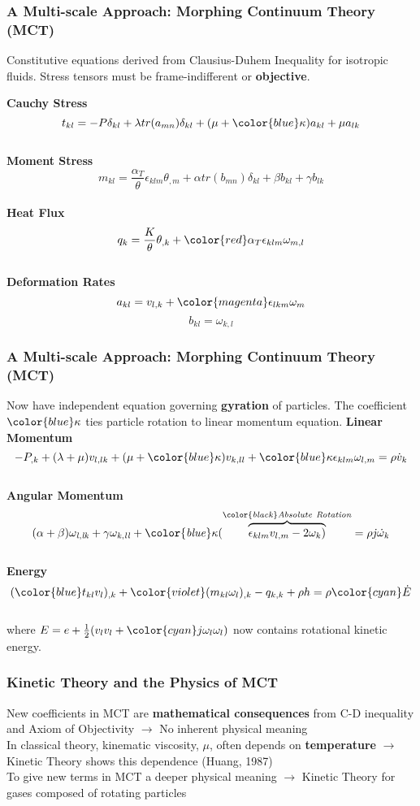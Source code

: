 \documentclass{beamer}
\begin{document}
\begin{frame}
\frametitle{A Multi-scale Approach: Morphing Continuum Theory (MCT)}
\small
Constitutive equations derived from Clausius-Duhem Inequality for isotropic 
fluids. Stress tensors must be frame-indifferent or \textbf{objective}.
\begin{multicols}{2}
\centering
\textbf{\large Cauchy Stress}
\normalsize
$$t_{kl} = -P\delta_{kl} + \lambda tr(a_{mn})\delta_{kl} + (\mu + {\color{blue}\kappa})a_{kl} + \mu a_{lk} $$\\
\textbf{\large Moment Stress}
\normalsize
{\color{violet}$$m_{kl} = \frac{\alpha_{T}}{\theta} \epsilon_{klm} \theta_{,m} + \alpha tr(b_{mn})\delta_{kl} + \beta b_{kl} + \gamma b_{lk} $$}\\
\textbf{\large Heat Flux}
\normalsize
$$q_{k} = \frac{K}{\theta}\theta_{,k} + 
{\color{red}\alpha_{T}\epsilon_{klm}\omega_{m,l} } $$\\
\textbf{\large Deformation Rates}
$$ a_{kl}  = v_{l,k} + {\color{magenta}\epsilon_{lkm}\omega_{m}}$$
{\color{violet}$$ b_{kl} = \omega_{k,l} $$}
\end{multicols}
\end{frame}
\begin{frame}
\frametitle{A Multi-scale Approach: Morphing Continuum Theory (MCT)}
\small
Now have independent equation governing \textbf{gyration} of 
particles. The coefficient $\color{blue} \kappa$ ties particle rotation to 
linear momentum equation. 
\vfill
\centering
\textbf{Linear Momentum}
\normalsize
$$-P_{,k} + (\lambda + \mu)v_{l,lk} + (\mu + {\color{blue}\kappa})v_{k,ll} + {\color{blue}\kappa\epsilon_{klm}\omega_{l,m}} = \rho\dot{v}_{k}$$ \\
\textbf{\color{violet}Angular Momentum}
\normalsize
$$\it (\alpha + \beta)\omega_{l,lk} + \gamma \omega_{k,ll} + 
{\color{blue}\kappa(\overbrace{\epsilon_{klm}v_{l,m} - 
2\omega_{k})}^{{\color{black}Absolute \ Rotation}}} = \rho j\dot{\omega}_{k}  
$$\\
\pause
\textbf{Energy}
$$({\color{blue}t_{kl}}v_{l})_{,k} + {\color{violet}(m_{kl}\omega_{l})_{,k}} - q_{k,k} + \rho h  = \rho{\color{cyan}\dot{E}} $$ \\
\textnormal
where $E = e + \frac{1}{2}(v_{l}v_{l} + {\color{cyan}j\omega_{l}\omega_{l}})$ 
now contains rotational kinetic energy. 
\end{frame}

\begin{frame}
 \frametitle {Kinetic Theory and the Physics of MCT}
 \Large
 New coefficients in MCT are \textbf{mathematical consequences} from C-D 
inequality and Axiom of Objectivity \pause $\rightarrow$ No inherent physical 
meaning \\
\pause
\vspace{5mm}
In classical theory, kinematic viscosity, $\mu$, often depends on 
\textbf{temperature} \pause $\rightarrow$ Kinetic Theory shows this dependence 
(Huang, 1987) \\
\vspace{5mm}
\pause
To give new terms in MCT a deeper physical meaning \pause $\rightarrow$ Kinetic 
Theory for gases composed of rotating particles
\end{frame}
\end{document}
